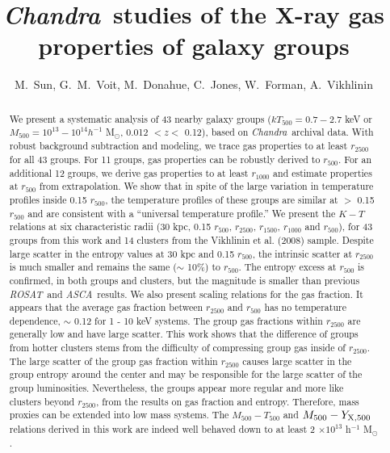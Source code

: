 \documentclass{aastex}
\def\asca       {{\em ASCA}\/}
\def\chandra    {{\em Chandra}\/}
\def\rosat      {{\em ROSAT}\/}
\begin{document}
\title{\chandra\ studies of the X-ray gas properties of galaxy groups}

\author{
M.\ Sun,
G.\ M.\ Voit,%
M.\ Donahue,%
C.\ Jones,%
W.\ Forman,%
A.\ Vikhlinin%
}



\begin{abstract}

We present a systematic analysis of 43 nearby galaxy groups ($kT_{500} = 0.7 - 2.7$
keV or $M_{500} = 10^{13} - 10^{14} h^{-1}$ M$_{\odot}$, 0.012 $<z<$ 0.12), based
on \chandra\ archival data. With robust background subtraction and modeling,
we trace gas properties to at least $r_{2500}$ for all 43 groups. For 11 groups,
gas properties can be robustly derived to $r_{500}$. For an additional 12 groups,
we derive gas properties to at least $r_{1000}$ and estimate properties at $r_{500}$
from extrapolation. We show that in spite of the large variation in temperature
profiles inside 0.15 $r_{500}$, the temperature profiles of these groups are similar
at $>$ 0.15 $r_{500}$ and are consistent with a ``universal temperature profile.''
We present the $K - T$ relations at six characteristic radii (30 kpc, 0.15 $r_{500}$,
$r_{2500}$, $r_{1500}$, $r_{1000}$ and $r_{500}$), for 43 groups from this work and
14 clusters from the Vikhlinin et al. (2008) sample. Despite large scatter in the
entropy values at 30 kpc and 0.15 $r_{500}$, the intrinsic scatter at $r_{2500}$
is much smaller and remains the same ($\sim$ 10\%) to $r_{500}$. The entropy excess
at $r_{500}$ is confirmed, in both groups and clusters, but the magnitude is smaller
than previous \rosat\ and \asca\ results. We also present scaling relations for the
gas fraction. It appears that the average gas fraction between $r_{2500}$ and $r_{500}$
has no temperature dependence, $\sim$ 0.12 for 1 - 10 keV systems. The group gas
fractions within $r_{2500}$ are generally low and have large scatter.
This work shows that the difference of groups from hotter clusters stems from the
difficulty of compressing group gas inside of $r_{2500}$. The large
scatter of the group gas fraction within $r_{2500}$ causes large scatter in the group
entropy around the center and may be responsible for the large scatter of the
group luminosities. Nevertheless, the groups appear more regular and more like clusters
beyond $r_{2500}$, from the results on gas fraction and entropy.
Therefore, mass proxies can be extended into low mass systems. The $M_{500} - T_{500}$
and $M_{500} - Y_{\rm X, 500}$ relations derived in this work are indeed well behaved
down to at least 2 $\times 10^{13}$ h$^{-1}$ M$_{\odot}$.

\end{abstract}
\end{document}
